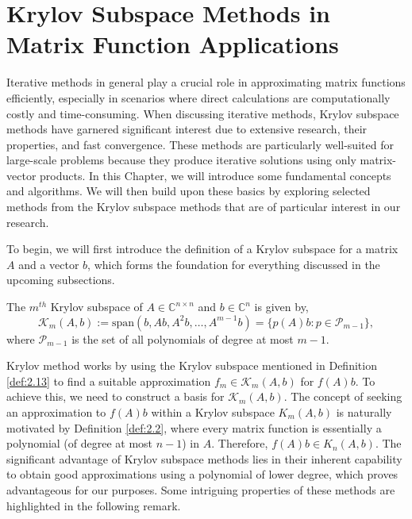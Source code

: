 \chapter{Krylov Subspace Methods in Matrix Function Applications}
\label{sec:kryl_subspace_app}

Iterative methods in general play a crucial role in approximating matrix functions efficiently, especially in scenarios where direct calculations are computationally costly and time-consuming. When discussing iterative methods, Krylov subspace methods have garnered significant interest due to extensive research, their properties, and fast convergence. These methods are particularly well-suited for large-scale problems because they produce iterative solutions using only matrix-vector products. In this Chapter, we will introduce some fundamental concepts and algorithms. We will then build upon these basics by exploring selected methods from the Krylov subspace methods that are of particular interest in our research.

To begin, we will first introduce the definition of a Krylov subspace for a matrix $A$ and a vector $b$, which forms the foundation for everything discussed in the upcoming subsections.

\begin{definition}
    \label{def:2.13}
    \cite{37}The $m^{th}$ Krylov subspace of $A \in \mathbb{C}^{n \times n}$ and $b \in \mathbb{C}^n$ is given by,
    \[
    \mathcal{K}_m(A, b) := \text{span}(b, Ab, A^2 b, \ldots, A^{m-1} b) = \{ p(A)b : p \in \mathcal{P}_{m-1} \},
    \]
    where $\mathcal{P}_{m-1}$ is the set of all polynomials of degree at most $m - 1$.
\end{definition}

Krylov method works by using the Krylov subspace mentioned in Definition \ref{def:2.13} to find a suitable approximation $f_{m}\in \mathcal{K}_m(A,b)$ for $f(A)b$. To achieve this, we need to construct a basis for $\mathcal{K}_m(A, b)$. The concept of seeking an approximation to $f(A)b$ within a Krylov subspace $K_m(A,b)$ is naturally motivated by Definition \ref{def:2.2}, where every matrix function is essentially a polynomial (of degree at most $n-1$) in $A$. Therefore, $f(A)b \in K_n(A,b)$. The significant advantage of Krylov subspace methods lies in their inherent capability to obtain good approximations using a polynomial of lower degree, which proves advantageous for our purposes. Some intriguing properties of these methods are highlighted in the following remark.

